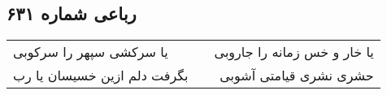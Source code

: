 \begin{center}
\section*{رباعی شماره ۶۳۱}
\label{sec:sh631}
\begin{longtable}{l p{0.5cm} r}
یا سرکشی سپهر را سرکوبی
&&
یا خار و خس زمانه را جاروبی
\\
بگرفت دلم ازین خسیسان یا رب
&&
حشری نشری قیامتی آشوبی
\\
\end{longtable}
\end{center}
